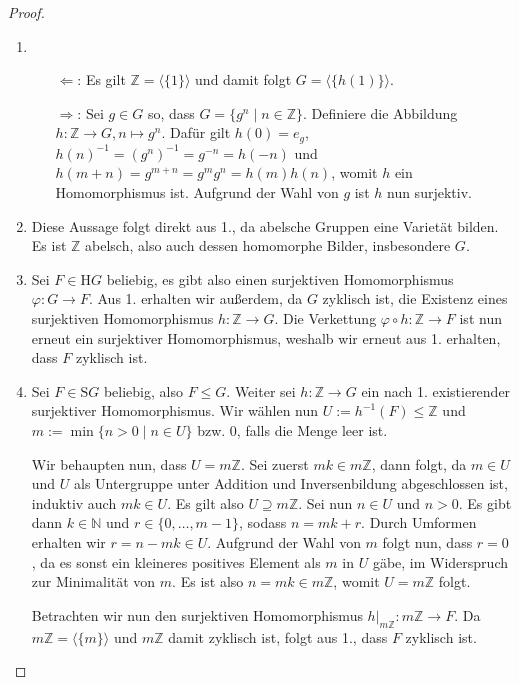 \begin{proof} {\ }
    \begin{enumerate}
        \item \begin{itemize}
            \item[$\Leftarrow$:] Es gilt $\mathbb{Z}=\langle \{1\} \rangle$ und damit folgt $G=\langle \{h(1)\} \rangle$.
            \item[$\Rightarrow$:] Sei $g \in G$ so, dass $G = \{g^n \mid n \in \mathbb{Z}\} $. Definiere die Abbildung $h: \mathbb{Z} \to G, n \mapsto g^n$. Dafür gilt $h(0) = e_g$, $h(n)^{-1} = (g^{n})^{-1} = g^{-n} = h(-n)$ und $h(m+n) = g^{m+n} = g^m g^n = h(m)h(n)$, womit $h$ ein Homomorphismus ist. Aufgrund der Wahl von $g$ ist $h$ nun surjektiv.
        \end{itemize}
        \item Diese Aussage folgt direkt aus 1., da abelsche Gruppen eine Varietät bilden. Es ist $\mathbb{Z}$ abelsch, also auch dessen homomorphe Bilder, insbesondere $G$.
        \item Sei $F \in \mathrm{H}G$ beliebig, es gibt also einen surjektiven Homomorphismus $\varphi: G \to F$. Aus 1. erhalten wir außerdem, da $G$ zyklisch ist, die Existenz eines surjektiven Homomorphismus $h: \mathbb{Z} \to G$. Die Verkettung $\varphi \circ h: \mathbb{Z} \to F$ ist nun erneut ein surjektiver Homomorphismus, weshalb wir erneut aus 1. erhalten, dass $F$ zyklisch ist.
        \item Sei $F \in \mathrm{S}G$ beliebig, also $F \le G$. Weiter sei $h: \mathbb{Z} \to G$ ein nach 1. existierender surjektiver Homomorphismus.
        Wir wählen nun $U := h^{-1}(F) \le \mathbb{Z}$ und $m := \min\{n > 0 \mid n \in U\}$ bzw. $0$, falls die Menge leer ist.
        
        Wir behaupten nun, dass $U = m \mathbb{Z}$. Sei zuerst $mk \in m\mathbb{Z}$, dann folgt, da $m \in U$ und $U$ als Untergruppe unter Addition und Inversenbildung abgeschlossen ist, induktiv auch $mk \in U$. Es gilt also $U \supseteq m\mathbb{Z}$. Sei nun $n \in U$ und \obda $n > 0$. Es gibt dann $k \in \mathbb{N}$ und $r \in \{0, \ldots, m-1\}$, sodass $n = mk+r$. Durch Umformen erhalten wir $r = n - mk \in U$. Aufgrund der Wahl von $m$ folgt nun, dass $r = 0$, da es sonst ein kleineres positives Element als $m$ in $U$ gäbe, im Widerspruch zur Minimalität von $m$. Es ist also $n = mk \in m\mathbb{Z}$, womit $U = m\mathbb{Z}$ folgt.

        Betrachten wir nun den surjektiven Homomorphismus $h\vert_{m\mathbb{Z}}: m\mathbb{Z} \to F$. Da $m\mathbb{Z} = \langle\{m\}\rangle$ und $m\mathbb{Z}$ damit zyklisch ist, folgt aus 1., dass $F$ zyklisch ist.
    \end{enumerate}
\end{proof}

